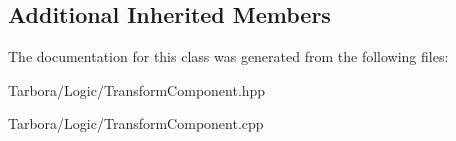 \subsection*{Additional Inherited Members}


The documentation for this class was generated from the following files\+:\begin{DoxyCompactItemize}
\item 
Tarbora/\+Logic/Transform\+Component.\+hpp\item 
Tarbora/\+Logic/Transform\+Component.\+cpp\end{DoxyCompactItemize}
